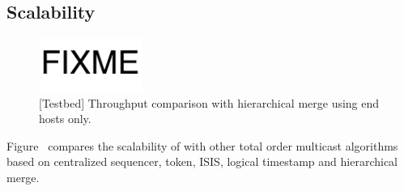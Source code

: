 \subsection{Scalability}

\begin{figure}[t]
\centering
\includegraphics[width=0.3\textwidth]{images/fixme.pdf}
\caption{[Testbed] Throughput comparison with hierarchical merge using end hosts only.}
\label{fig:total-order}
\end{figure}

Figure~\label{fig:total-order} compares the scalability of \sys with other total order multicast algorithms based on centralized sequencer, token, ISIS, logical timestamp and hierarchical merge.



